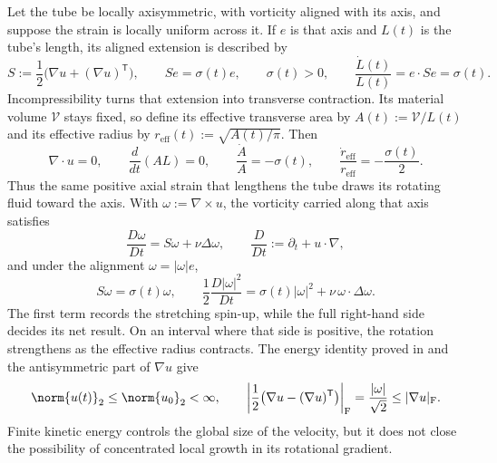 Let the tube be locally axisymmetric, with vorticity aligned with its axis, and suppose the strain is locally uniform across it.
If \(e\) is that axis and \(L(t)\) is the tube's length, its aligned extension is described by
\[
  S:=\frac12\bigl(\nabla u+(\nabla u)^{\mathsf T}\bigr),
  \qquad
  Se=\sigma(t)e,
  \qquad
  \sigma(t)>0,
  \qquad
  \frac{\dot L(t)}{L(t)}
  =
  e\cdot Se
  =
  \sigma(t).
\]
Incompressibility turns that extension into transverse contraction.
Its material volume \(\mathcal V\) stays fixed, so define its effective transverse area by \(A(t):=\mathcal V/L(t)\) and its effective radius by \(r_{\mathrm{eff}}(t):=\sqrt{A(t)/\pi}\).
Then
\[
  \nabla\cdot u=0,
  \qquad
  \frac{d}{dt}(A L)=0,
  \qquad
  \frac{\dot A}{A}=-\sigma(t),
  \qquad
  \frac{\dot r_{\mathrm{eff}}}{r_{\mathrm{eff}}}
  =
  -\frac{\sigma(t)}{2}.
\]
Thus the same positive axial strain that lengthens the tube draws its rotating fluid toward the axis.
With \(\omega:=\nabla\times u\), the vorticity carried along that axis satisfies
\[
  \frac{D\omega}{Dt}
  =
  S\omega+\nu\Delta\omega,
  \qquad
  \frac{D}{Dt}
  :=
  \partial_t+u\cdot\nabla,
\]
and under the alignment \(\omega=|\omega|e\),
\[
  S\omega
  =
  \sigma(t)\omega,
  \qquad
  \frac12\frac{D|\omega|^2}{Dt}
  =
  \sigma(t)|\omega|^2
  +
  \nu\,\omega\cdot\Delta\omega.
\]
The first term records the stretching spin-up, while the full right-hand side decides its net result.
On an interval where that side is positive, the rotation strengthens as the effective radius contracts.
The energy identity proved in  and the antisymmetric part of \(\nabla u\) give
\[
  \norm{u(t)}_2
  \leq
  \norm{u_0}_2
  <\infty,
  \qquad
  \left|\frac12\bigl(\nabla u-(\nabla u)^{\mathsf T}\bigr)\right|_{\mathrm F}
  =
  \frac{|\omega|}{\sqrt2}
  \leq
  |\nabla u|_{\mathrm F}.
\]
Finite kinetic energy controls the global size of the velocity, but it does not close the possibility of concentrated local growth in its rotational gradient.


